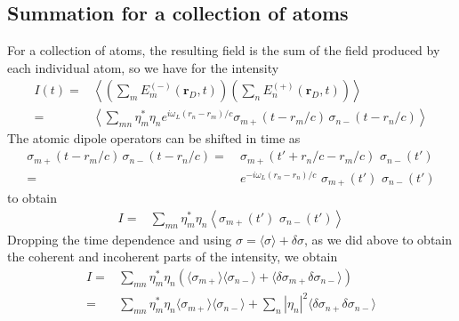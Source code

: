 \documentclass[11pt,letter]{article}
\newcommand{\bv}[1]{\ensuremath{\bm{#1}}}
\begin{document}
\subsection{Summation for a collection of atoms} 

For a collection of atoms, the resulting field is the sum of the field produced
by each individual atom, so we have for the intensity 
\begin{equation}
\begin{split}
I(t)  = & 
    \left\langle \left( \sum_{m} E_{m}^{(-)}(\bv{r}_{D}, t) \right)
            \left( \sum_{n} E_{n}^{(+)}(\bv{r}_{D}, t) \right) \right\rangle \\
     = & \left\langle
      \sum_{mn} \eta_{m}^{*} \eta_{n} e^{i\omega_{L}(r_{n}-r_{m})/c} 
            \sigma_{m+}(t- r_{m}/c )\, \sigma_{n-}(t - r_{n}/c) 
          \right\rangle 
\end{split} 
\end{equation}
The atomic dipole operators can be shifted in time as 
\begin{equation}
\begin{split}
 \sigma_{m+}(t- r_{m}/c )\, \sigma_{n-}(t - r_{n}/c)  
    =  &
 \ \sigma_{m+}(t' +  r_{n}/c - r_{m}/c ) \,\, \sigma_{n-}(t')  \\
  =  &  \  e^{-i\omega_{L}( r_{n} - r_{n} )/c } \,\, \sigma_{m+}(t') \,\, \sigma_{n-}(t') 
\end{split}
\end{equation}
to obtain  
\begin{equation}
\begin{split}
I  = & 
      \sum_{mn} \eta_{m}^{*} \eta_{n}
            \left\langle \sigma_{m+}(t' )\,\, \sigma_{n-}(t') 
          \right\rangle  
\end{split} 
\end{equation}
Dropping the time dependence and using $\sigma=\langle \sigma \rangle + \delta
\sigma$, as we did above to obtain the coherent and incoherent parts of the
intensity, we obtain
\begin{equation}
\begin{split}
 I  = &
    \sum_{mn}  \eta_{m}^{*}\eta_{n} \left(
              \langle \sigma_{m+}\rangle \langle \sigma_{n-} \rangle  
            + \langle \delta \sigma_{m+} \delta \sigma_{n-} \rangle \right) \\
    = & 
    \sum_{mn}  \eta_{m}^{*} \eta_{n}
        \langle  \sigma_{m+}\rangle \langle \sigma_{n-} \rangle 
   + \sum_{n} | \eta_{n}|^{2} \langle \delta \sigma_{n+} \delta \sigma_{n-} \rangle 
\end{split} 
\end{equation}
\end{document}
